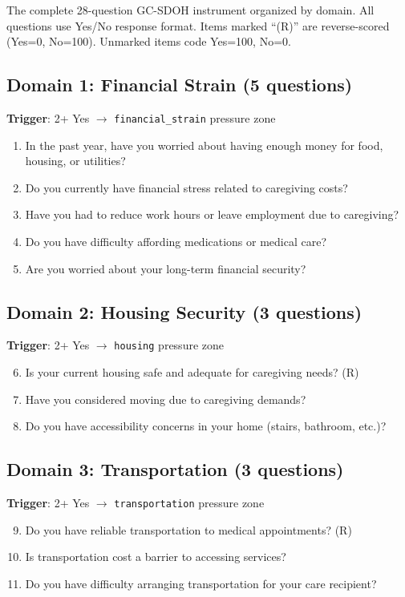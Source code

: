 \documentclass{article}%
\begin{document}
The complete 28-question GC-SDOH instrument organized by domain. All questions use Yes/No response format. Items marked ``(R)'' are reverse-scored (Yes=0, No=100). Unmarked items code Yes=100, No=0.

\subsection*{Domain 1: Financial Strain (5 questions)}
\textbf{Trigger}: 2+ Yes $\rightarrow$ \texttt{financial\_strain} pressure zone

\begin{enumerate}
    \item In the past year, have you worried about having enough money for food, housing, or utilities?
    \item Do you currently have financial stress related to caregiving costs?
    \item Have you had to reduce work hours or leave employment due to caregiving?
    \item Do you have difficulty affording medications or medical care?
    \item Are you worried about your long-term financial security?
\end{enumerate}

\subsection*{Domain 2: Housing Security (3 questions)}
\textbf{Trigger}: 2+ Yes $\rightarrow$ \texttt{housing} pressure zone

\begin{enumerate}
    \setcounter{enumi}{5}
    \item Is your current housing safe and adequate for caregiving needs? (R)
    \item Have you considered moving due to caregiving demands?
    \item Do you have accessibility concerns in your home (stairs, bathroom, etc.)?
\end{enumerate}

\subsection*{Domain 3: Transportation (3 questions)}
\textbf{Trigger}: 2+ Yes $\rightarrow$ \texttt{transportation} pressure zone

\begin{enumerate}
    \setcounter{enumi}{8}
    \item Do you have reliable transportation to medical appointments? (R)
    \item Is transportation cost a barrier to accessing services?
    \item Do you have difficulty arranging transportation for your care recipient?
\end{enumerate}
\end{document}
